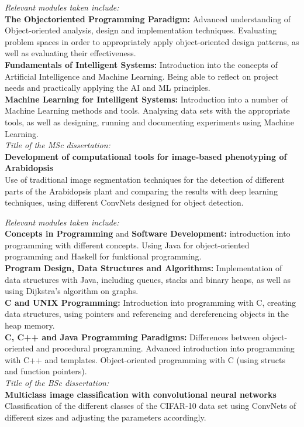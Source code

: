 \documentclass[12pt,a4paper,oneside,final]{scrartcl}
\begin{document}
{
    \textit{Relevant modules taken include:}\\[0.5em]
    \textbf{The Objectoriented Programming Paradigm:} Advanced understanding of Object-oriented analysis, design and implementation techniques. Evaluating problem spaces in order to appropriately apply object-oriented design patterns, as well as evaluating their effectiveness.\\[0.5em]
    \textbf{Fundamentals of Intelligent Systems:} Introduction into the concepts of Artificial Intelligence and Machine Learning. Being able to reflect on project needs and practically applying the AI and ML principles.\\[0.5em]
    \textbf{Machine Learning for Intelligent Systems:} Introduction into a number of Machine Learning methods and tools. Analysing data sets with the appropriate tools, as well as designing, running and documenting experiments using Machine Learning.\\[0.5em]
    \textit{Title of the MSc dissertation:}\\[0.5em]
    \textbf{Development of computational tools for image-based phenotyping of Arabidopsis}\\
    Use of traditional image segmentation techniques for the detection of different parts of the Arabidopsis plant and comparing the results with deep learning techniques, using different ConvNets designed for object detection.
}

\sepspace{}
\pagebreak
{}
{
    \textit{Relevant modules taken include:}\\[0.5em]
    \textbf{Concepts in Programming} and \textbf{Software Development:} introduction into programming with different concepts. Using Java for object-oriented programming and Haskell for funktional programming.
    \\[0.5em]
    \textbf{Program Design, Data Structures and Algorithms:} Implementation of data structures with Java, including queues, stacks and binary heaps, as well as using Dijkstra's algorithm on graphs.\\[0.5em]
    \textbf{C and UNIX Programming:} Introduction into programming with C, creating data structures, using pointers and referencing and dereferencing objects in the heap memory.\\[0.5em]
    \textbf{C, C++ and Java Programming Paradigms:} Differences between object-oriented and procedural programming. Advanced introduction into programming with C++ and templates. Object-oriented programming with C (using structs and function pointers).\\[0.5em]
    \textit{Title of the BSc dissertation:}\\[0.5em]
    \textbf{Multiclass image classification with convolutional neural networks}\\
    Classification of the different classes of the CIFAR-10 data set using ConvNets of different sizes and adjusting the parameters accordingly.
}
\end{document}
